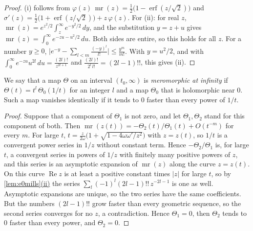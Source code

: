 \documentclass[10pt]{article}
\theoremstyle{definition}
\theoremstyle{remark}
\DeclareRobustCommand{\cpref}[2]{\hyperref[#1:#2]{\cref*{#1}(#2)}}
\begin{document}
\begin{proof}
(i) follows from $\varphi(z)\,\operatorname{mr}(z) = \frac12\big(1 - \operatorname{erf}(z/\sqrt2)\big)$ and $\sigma'(z) = \frac12\big(1 + \operatorname{erf}(z/\sqrt2)\big) + z\,\varphi(z)$. For (ii): for real $z$, $\operatorname{mr}(z) = e^{z^2/2}\int_z^\infty e^{-y^2/2}\,dy$, and the substitution $y = z + u$ gives $\operatorname{mr}(z) = \int_0^\infty e^{-zu - u^2/2}\,du$. Both sides are entire, so this holds for all $z$. For a number $y \ge 0$, $\big\lvert e^{-y} - \sum_{l<m}\frac{(-y)^l}{l!}\big\rvert \le \frac{y^m}{m!}$. With $y = u^2/2$, and with $\int_0^\infty e^{-zu}u^{2l}\,du = \frac{(2l)!}{z^{2l+1}}$ and $\frac{(2l)!}{2^l\,l!} = (2l-1)!!$, this gives (ii).
\end{proof}

We say that a map $\Theta$ on an interval $(t_0, \infty)$ is \emph{meromorphic at infinity} if $\Theta(t) = t^{l}\,\Theta_0(1/t)$ for an integer $l$ and a map $\Theta_0$ that is holomorphic near $0$. Such a map vanishes identically if it tends to $0$ faster than every power of $1/t$.

\lemMills*

\begin{proof}
Suppose that a component of $\Theta_1$ is not zero, and let $\Theta_1, \Theta_2$ stand for this component of both. Then $\operatorname{mr}(z(t)) = -\Theta_2(t)/\Theta_1(t) + O(t^{-m})$ for every $m$. For large $t$, $t = \frac{z}{2\omega}\big(1 + \sqrt{1 - 4\omega\omega'/z^2}\big)$ with $z = z(t)$, so $1/t$ is a convergent power series in $1/z$ without constant term. Hence $-\Theta_2/\Theta_1$ is, for large $t$, a convergent series in powers of $1/z$ with finitely many positive powers of $z$, and this series is an asymptotic expansion of $\operatorname{mr}(z)$ along the curve $z = z(t)$. On this curve $\operatorname{Re}z$ is at least a positive constant times $\lvert z\rvert$ for large $t$, so by \cpref{lem:e0mills}{ii} the series $\sum_l(-1)^l(2l-1)!!\,z^{-2l-1}$ is one as well. Asymptotic expansions are unique, so the two series have the same coefficients. But the numbers $(2l-1)!!$ grow faster than every geometric sequence, so the second series converges for no $z$, a contradiction. Hence $\Theta_1 = 0$, then $\Theta_2$ tends to $0$ faster than every power, and $\Theta_2 = 0$.
\end{proof}
\end{document}
